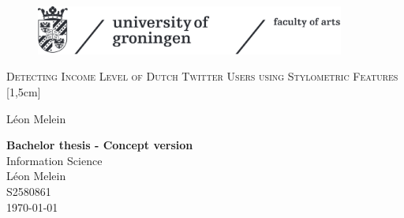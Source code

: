 \documentclass[
10pt, %
a4paper, %
oneside, %
headinclude,footinclude, %
] {book}%
\title{\normalfont\spacedallcaps{title}} %
\author{\spacedlowsmallcaps{author}} %
\date{} %
\begin{document}


\pagestyle{scrheadings} %



\hypersetup{pageanchor=false}
\begin{titlepage}
\thispagestyle{empty}
\begin{figure}[h!] %
\includegraphics[width=4in]{ruglogo} 
\end{figure}

\begin{center}
\vspace{30 mm}
\begingroup \linespread{1,75} \selectfont 
\textsc{\LARGE Detecting Income Level of Dutch Twitter Users using Stylometric Features}\\
[1,5cm]
\endgroup

L\'eon Melein\\[2,5cm]

\end{center}
\vfill
\textbf{Bachelor thesis - Concept version}\\  %
Information Science\\  %
L\'eon Melein\\
S2580861\\
\today
\end{titlepage}
\hypersetup{pageanchor=true}
\end{document}
